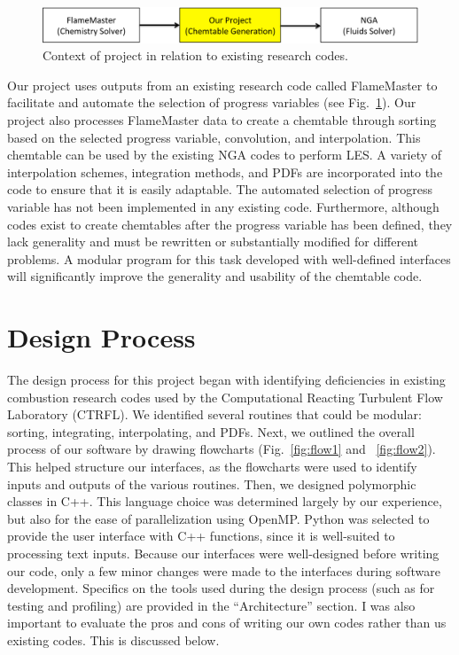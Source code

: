 \documentclass[11pt]{article}
\begin{document}
\begin{figure} [h]
\centering
\includegraphics[width=\textwidth]{scope}
\caption{\label{fig:overview} Context of project in relation to existing research codes.}
\label{fig:codes}
\end{figure}

Our project uses outputs from an existing research code called
FlameMaster to facilitate and automate the selection of progress
variables (see Fig.~\ref{fig:codes}). Our project also processes
FlameMaster data to create a chemtable through sorting based on the
selected progress variable, convolution, and interpolation. This
chemtable can be used by the existing NGA codes to perform LES. A
variety of interpolation schemes, integration methods, and PDFs are
incorporated into the code to ensure that it is easily adaptable. The
automated selection of progress variable has not been implemented in
any existing code. Furthermore, although codes exist to create
chemtables after the progress variable has been defined, they lack
generality and must be rewritten or substantially modified for
different problems. A modular program for this task developed with 
well-defined interfaces will significantly improve the generality and
usability of the chemtable code.

\section{Design Process}
The design process for this project began with identifying
deficiencies in existing combustion research codes used by the
Computational Reacting Turbulent Flow Laboratory (CTRFL). We identified
several routines that could be modular: sorting, integrating,
interpolating, and PDFs. Next, we outlined the overall process of our
software by drawing flowcharts (Fig.~\ref{fig:flow1} and
~\ref{fig:flow2}). This helped structure our interfaces, as the
flowcharts were used to identify inputs and outputs of the various
routines. 
Then, we designed polymorphic classes in C++. This language choice was
determined largely by our experience, but also for the ease of
parallelization using OpenMP.
Python was selected to provide the user interface with C++ functions,
since it is well-suited to processing text inputs. Because our
interfaces were well-designed before writing our code, only a few
minor changes were made to the interfaces during software development.
Specifics on the tools used during the design process (such as for
testing and profiling) are provided in the “Architecture” section.  I
was also important to evaluate the pros and cons of writing our own
codes rather than us existing codes. This is discussed below.
\end{document}

